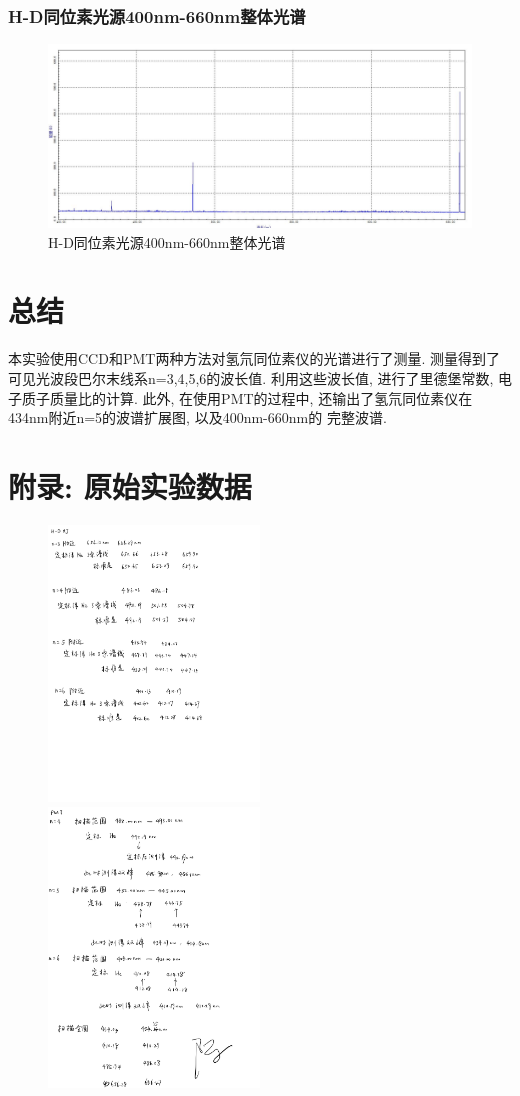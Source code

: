 \documentclass[12pt,a4paper]{article}
\begin{document}
\subsubsection{H-D同位素光源400nm-660nm整体光谱}
\begin{figure}[H]
    \centering
    \includegraphics[width=1.35\textwidth,angle=-90]{HDALL3.JPG}
    \caption{H-D同位素光源400nm-660nm整体光谱}
\end{figure}


\section{总结}
本实验使用CCD和PMT两种方法对氢氘同位素仪的光谱进行了测量. 测量得到了可见光波段巴尔末线系n=3,4,5,6的波长值. 
利用这些波长值, 进行了里德堡常数, 电子质子质量比的计算. 此外, 在使用PMT的过程中, 还输出了氢氘同位素仪在434nm附近n=5的波谱扩展图, 以及400nm-660nm的
完整波谱. 
\section{附录: 原始实验数据}
\begin{figure}[H]
    \centering
    \includegraphics[width=0.5\textwidth]{附录1.jpg}
    \includegraphics[width=0.5\textwidth]{附录2.jpg}
\end{figure}
\end{document}

